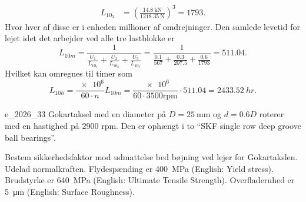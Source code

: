\begin{derivation}
\begin{align*}
      L_{10_3} &= \left( \frac{\qty{14,8}{\kN} }{\qty{1218,35}{\N} } \right)^{3} = \num{1793} 
    .\end{align*}
    Hvor hver af disse er i enheden millioner af omdrejninger. 
    Den samlede levetid for lejet idet det arbejder ved alle tre lastblokke er
    \begin{equation*}
      L_{10m} = \frac{1}{\frac{U_1}{L_{10_1}} + \frac{U_2}{L_{10_2}} + \frac{U_3}{L_{10_3}}} = \frac{1}{\frac{\num{0,1}}{\num{567} } + \frac{\num{0,3}}{\num{207,5}} + \frac{\num{0,6}}{\num{1793} }} = \num{511,04} 
    .\end{equation*}
    Hvilket kan omregnes til timer som
    \begin{equation*}
      L_{10h} = \frac{\num{e6}}{60 \cdot n} L_{10m} = \frac{\num{e6} }{60 \cdot 3500 \text{rpm}} \cdot \num{511,04}  = \qty{2433,52}{hr} 
    .\end{equation*}

    \end{derivation}


    \begin{problemwithimage}{e_2026_3}{3}
      Gokartaksel med en diameter på $D = \qty{25}{\mm}$ og $d = \num{0,6} D$ roterer med en hastighed på 2900 rpm.
      Den er ophængt i to ``SKF single row deep groove ball bearings''.

      Bestem sikkerhedsfaktor mod udmattelse bed bøjning ved lejer for Gokartakslen.
      Udelad normalkraften.
      Flydespænding er \qty{400}{\MPa} (English: Yield stress).
      Brudstyrke er \qty{640}{\MPa} (English: Ultimate Tensile Strength).
      Overfladeruhed er \qty{5}{\micro\m} (English: Surface Roughness).
    \end{problemwithimage}


